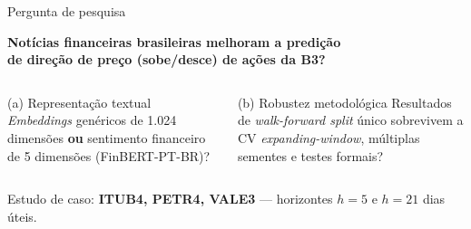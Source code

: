 \documentclass[11pt,aspectratio=169]{beamer}
\begin{document}
\begin{frame}{Pergunta de pesquisa}
  \begin{center}
    \Large\textbf{Notícias financeiras brasileiras melhoram a predição\\de direção de preço (sobe/desce) de ações da B3?}
  \end{center}
  \vspace{2ex}
  \begin{columns}[T]
    \begin{block}{(a) Representação textual}
      \textit{Embeddings} genéricos de 1.024 dimensões \textbf{ou}
      sentimento financeiro de 5 dimensões (FinBERT-PT-BR)?
    \end{block}
    \begin{block}{(b) Robustez metodológica}
      Resultados de \textit{walk-forward split} único sobrevivem a
      CV \textit{expanding-window}, múltiplas sementes e testes formais?
    \end{block}
  \end{columns}
  \vspace{1.5ex}
  \centering
  Estudo de caso: \textbf{ITUB4, PETR4, VALE3} --- horizontes $h=5$ e $h=21$ dias úteis.
\end{frame}
\end{document}
